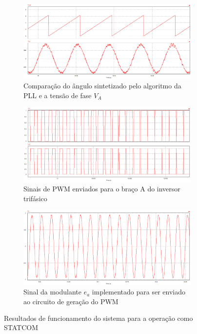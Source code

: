 \begin{figure}[!hbt]
	\centering
	\begin{subfigure}[b]{0.5\textwidth}
		\centering
		\includegraphics[width=\textwidth]{figuras/sim_figures/statcom/teta.PNG}
		\caption{Comparação do ângulo sintetizado pelo algoritmo da PLL e a tensão de fase $V_A$}
	\end{subfigure}
	
	\begin{subfigure}[b]{0.5\textwidth}
		\centering
		\includegraphics[width=\textwidth]{figuras/sim_figures/statcom/pwm.PNG}
		\caption{Sinais de PWM enviados para o braço A do inversor trifásico}
	\end{subfigure}

	\begin{subfigure}[b]{0.5\textwidth}
		\centering
		\includegraphics[width=\textwidth]{figuras/sim_figures/statcom/modulante.PNG}
		\caption{Sinal da modulante $e_a$ implementado para ser enviado ao circuito de geração do PWM}
	\end{subfigure}

	\caption{Resultados de funcionamento do sistema para a operação como STATCOM}
    \label{fig:sim-statcom2}
\end{figure}

